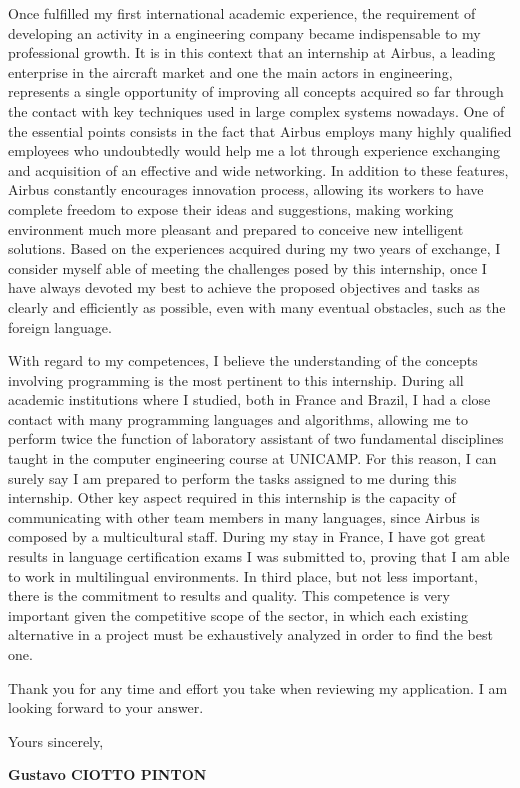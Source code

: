 \documentclass[12pt, a4paper]{article}
\begin{document}
\vspace{12pt}

Once fulfilled my first international academic experience, the requirement of
developing an activity in a engineering company became indispensable to my
professional growth. It is in this context that an internship at Airbus, a
leading enterprise in the aircraft market and one the main actors in
engineering, represents a single opportunity of improving all concepts acquired
so far through the contact with key techniques used in large complex systems
nowadays.  One of the essential points consists in the fact that Airbus employs
many highly qualified employees who undoubtedly would help me a lot through
experience exchanging and acquisition of an effective and wide networking. In
addition  to these features, Airbus constantly encourages innovation process,
allowing its workers to have complete freedom to expose their ideas and
suggestions, making working environment much more pleasant and prepared to
conceive new intelligent solutions. Based on the experiences acquired during my
two years of exchange, I consider myself able of meeting the challenges posed by
this internship, once I have always devoted my best to achieve the proposed
objectives and tasks as clearly and efficiently as possible, even with many
eventual obstacles, such as the foreign language.


\vspace{12pt}

With regard to my competences,  I believe the understanding of the concepts
involving programming is the most pertinent to this internship. During all
academic institutions where I studied, both in France and Brazil, I had a close
contact with many programming languages and algorithms, allowing me to perform
twice the function of laboratory assistant of two fundamental disciplines taught
in the computer engineering course at UNICAMP. For this reason, I can surely say
I am prepared to perform the tasks assigned to me during this internship. Other
key aspect required in this internship is the capacity of communicating with
other team members in many languages, since Airbus is composed by a
multicultural staff. During my stay in France, I have got great results in
language certification exams I was submitted to, proving that I am able to work
in multilingual environments. In third place, but not less important, there is
the commitment to results and quality. This competence is very important given
the competitive scope of the sector,  in which each existing alternative  in a
project must be exhaustively analyzed in order to find the best one.


	
\vspace{12pt}

Thank you for any time and effort you take when reviewing my application. I am
looking forward to your answer.

\vspace{12pt}

Yours sincerely,

\vspace{12pt}

\textbf{Gustavo CIOTTO PINTON}
\end{document}
